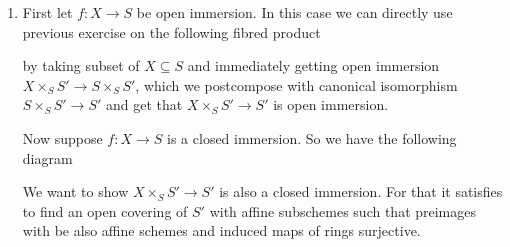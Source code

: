 \begin{exercise}{2}
    \begin{enumerate}
        \item{
            First let $f \colon X \rightarrow S$ be open immersion. In this case
            we can directly use previous exercise on the following fibred
            product
                      
            \begin{center}
            \end{center}

            by taking subset of $X \subseteq S$ and immediately getting open
            immersion $X \times_S S' \rightarrow S \times_S S'$, which we
            postcompose with canonical isomorphism $S \times_S S' \rightarrow
            S'$ and get that $X \times_S S' \rightarrow S'$ is open immersion.

            Now suppose $f \colon X \rightarrow S$ is a closed immersion. So we
            have the following diagram

            \begin{center}
            \end{center}

            We want to show $X \times_S S' \rightarrow S'$ is also a closed
            immersion. For that it satisfies to find an open covering of $S'$
            with affine subschemes such that preimages with be also affine schemes
            and induced maps of rings surjective.

}
\end{enumerate}
\end{exercise}
